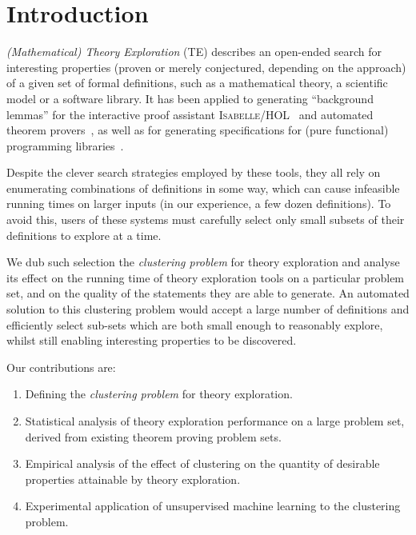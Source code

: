\section{Introduction}

\emph{(Mathematical) Theory Exploration} (TE) describes an open-ended search for
interesting properties (proven or merely conjectured, depending on the approach)
of a given set of formal definitions, such as a mathematical theory, a
scientific model or a software library. It has been applied to generating
``background lemmas'' for the interactive proof assistant
\textsc{Isabelle/HOL}~\cite{johansson2009isacosy,Hipster} and automated
theorem provers~\cite{claessen2013automating}, as well as for generating
specifications for (pure functional) programming
libraries~\cite{QuickSpec,smallbone2017quick,braquehais2017speculate}.

Despite the clever search strategies employed by these tools, they all rely on
enumerating combinations of definitions in some way, which can cause infeasible
running times on larger inputs (in our experience, a few dozen definitions). To
avoid this, users of these systems must carefully select only small subsets of
their definitions to explore at a time.

We dub such selection the \emph{clustering problem} for theory exploration and
analyse its effect on the running time of theory exploration tools on a
particular problem set, and on the quality of the statements they are able to
generate. An automated solution to this clustering problem would accept a large
number of definitions and efficiently select sub-sets which are both small
enough to reasonably explore, whilst still enabling interesting properties to be
discovered.

Our contributions are:

\begin{enumerate}
  \item Defining the \emph{clustering problem} for theory exploration.
  \item Statistical analysis of theory exploration performance on a large
    problem set, derived from existing theorem proving problem sets.
  \item Empirical analysis of the effect of clustering on the quantity of
    desirable properties attainable by theory exploration.
  \item Experimental application of unsupervised machine learning to the
    clustering problem.
\end{enumerate}

